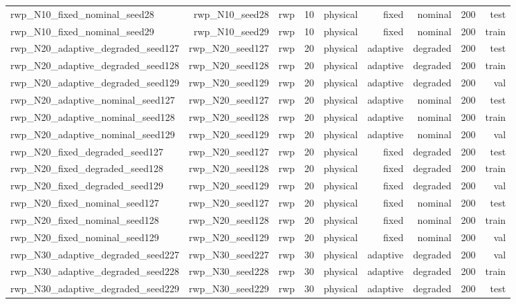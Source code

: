 \begin{tabular}{lrrrrrrrr}
rwp\_N10\_fixed\_nominal\_seed28 & rwp\_N10\_seed28 & rwp & 10 & physical & fixed & nominal & 200 & test \\
rwp\_N10\_fixed\_nominal\_seed29 & rwp\_N10\_seed29 & rwp & 10 & physical & fixed & nominal & 200 & train \\
rwp\_N20\_adaptive\_degraded\_seed127 & rwp\_N20\_seed127 & rwp & 20 & physical & adaptive & degraded & 200 & test \\
rwp\_N20\_adaptive\_degraded\_seed128 & rwp\_N20\_seed128 & rwp & 20 & physical & adaptive & degraded & 200 & train \\
rwp\_N20\_adaptive\_degraded\_seed129 & rwp\_N20\_seed129 & rwp & 20 & physical & adaptive & degraded & 200 & val \\
rwp\_N20\_adaptive\_nominal\_seed127 & rwp\_N20\_seed127 & rwp & 20 & physical & adaptive & nominal & 200 & test \\
rwp\_N20\_adaptive\_nominal\_seed128 & rwp\_N20\_seed128 & rwp & 20 & physical & adaptive & nominal & 200 & train \\
rwp\_N20\_adaptive\_nominal\_seed129 & rwp\_N20\_seed129 & rwp & 20 & physical & adaptive & nominal & 200 & val \\
rwp\_N20\_fixed\_degraded\_seed127 & rwp\_N20\_seed127 & rwp & 20 & physical & fixed & degraded & 200 & test \\
rwp\_N20\_fixed\_degraded\_seed128 & rwp\_N20\_seed128 & rwp & 20 & physical & fixed & degraded & 200 & train \\
rwp\_N20\_fixed\_degraded\_seed129 & rwp\_N20\_seed129 & rwp & 20 & physical & fixed & degraded & 200 & val \\
rwp\_N20\_fixed\_nominal\_seed127 & rwp\_N20\_seed127 & rwp & 20 & physical & fixed & nominal & 200 & test \\
rwp\_N20\_fixed\_nominal\_seed128 & rwp\_N20\_seed128 & rwp & 20 & physical & fixed & nominal & 200 & train \\
rwp\_N20\_fixed\_nominal\_seed129 & rwp\_N20\_seed129 & rwp & 20 & physical & fixed & nominal & 200 & val \\
rwp\_N30\_adaptive\_degraded\_seed227 & rwp\_N30\_seed227 & rwp & 30 & physical & adaptive & degraded & 200 & val \\
rwp\_N30\_adaptive\_degraded\_seed228 & rwp\_N30\_seed228 & rwp & 30 & physical & adaptive & degraded & 200 & train \\
rwp\_N30\_adaptive\_degraded\_seed229 & rwp\_N30\_seed229 & rwp & 30 & physical & adaptive & degraded & 200 & test \\

\end{tabular}
